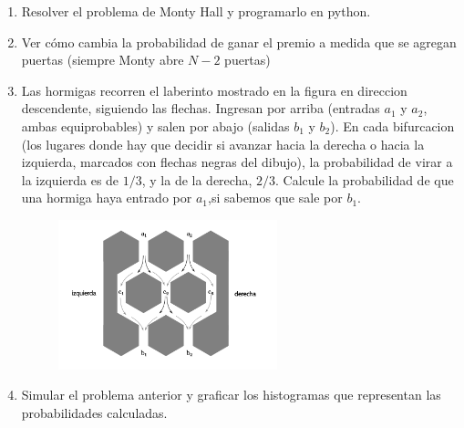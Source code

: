 \documentclass[12pt]{paper}
\begin{document}
\begin{enumerate}
\item Resolver el problema de Monty Hall y programarlo en python.
\item Ver cómo cambia la probabilidad de ganar el premio a medida que se agregan puertas (siempre Monty abre $N-2$ puertas)

\item Las hormigas recorren el laberinto mostrado en la figura en direccion descendente, siguiendo las flechas. Ingresan por arriba (entradas $a_{1}$ y $a_{2}$, ambas equiprobables) y salen por abajo (salidas $b_{1}$ y $b_{2}$). En cada bifurcacion (los lugares donde hay que decidir si avanzar hacia la derecha o hacia la izquierda, marcados con flechas negras del dibujo), la probabilidad de virar a la izquierda es de $1/3$, y la de la derecha, $2/3$. Calcule la probabilidad de que una hormiga haya entrado por $a_{1}$,si sabemos que sale por $b_{1}$.
\begin{figure}[ht]
    \centering
\includegraphics[width=0.6\textwidth]{bin/figs/laberint.png}
    \label{fig:lab}
\end{figure}
\item Simular el problema anterior y graficar los histogramas que representan las probabilidades calculadas.

\end{enumerate}

\pagestyle{empty}
\end{document}
